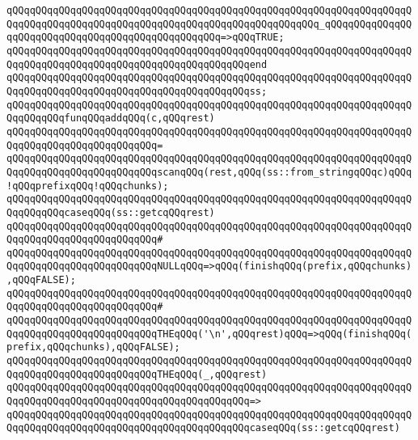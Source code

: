 \verb|qQQqqQQqqQQqqQQqqQQqqQQqqQQqqQQqqQQqqQQqqQQqqQQqqQQqqQQqqQQqqQQqqQQqqQQqqQQqqQQqqQQqqQQqqQQqqQQqqQQqqQQqqQQqqQQqqQQqqQQqqQQq_qQQqqQQqqQQqqQQqqQQqqQQqqQQqqQQqqQQqqQQqqQQqqQQqqQQq=>qQQqTRUE;|\newline
\verb|qQQqqQQqqQQqqQQqqQQqqQQqqQQqqQQqqQQqqQQqqQQqqQQqqQQqqQQqqQQqqQQqqQQqqQQqqQQqqQQqqQQqqQQqqQQqqQQqqQQqqQQqqQQqqQQqend|\newline
\newline
\verb|qQQqqQQqqQQqqQQqqQQqqQQqqQQqqQQqqQQqqQQqqQQqqQQqqQQqqQQqqQQqqQQqqQQqqQQqqQQqqQQqqQQqqQQqqQQqqQQqqQQqqQQqqQQqqQQqss;|\newline
\newline
\verb|qQQqqQQqqQQqqQQqqQQqqQQqqQQqqQQqqQQqqQQqqQQqqQQqqQQqqQQqqQQqqQQqqQQqqQQqqQQqqQQqfunqQQqaddqQQq(c,qQQqrest)|\newline
\verb|qQQqqQQqqQQqqQQqqQQqqQQqqQQqqQQqqQQqqQQqqQQqqQQqqQQqqQQqqQQqqQQqqQQqqQQqqQQqqQQqqQQqqQQqqQQqqQQq=|\newline
\verb|qQQqqQQqqQQqqQQqqQQqqQQqqQQqqQQqqQQqqQQqqQQqqQQqqQQqqQQqqQQqqQQqqQQqqQQqqQQqqQQqqQQqqQQqqQQqqQQqscanqQQq(rest,qQQq(ss::from_stringqQQqc)qQQq!qQQqprefixqQQq!qQQqchunks);|\newline
\newline
\verb|qQQqqQQqqQQqqQQqqQQqqQQqqQQqqQQqqQQqqQQqqQQqqQQqqQQqqQQqqQQqqQQqqQQqqQQqqQQqqQQqcaseqQQq(ss::getcqQQqrest)|\newline
\verb|qQQqqQQqqQQqqQQqqQQqqQQqqQQqqQQqqQQqqQQqqQQqqQQqqQQqqQQqqQQqqQQqqQQqqQQqqQQqqQQqqQQqqQQqqQQqqQQq#|\newline
\verb|qQQqqQQqqQQqqQQqqQQqqQQqqQQqqQQqqQQqqQQqqQQqqQQqqQQqqQQqqQQqqQQqqQQqqQQqqQQqqQQqqQQqqQQqqQQqqQQqNULLqQQq=>qQQq(finishqQQq(prefix,qQQqchunks),qQQqFALSE);|\newline
\verb|qQQqqQQqqQQqqQQqqQQqqQQqqQQqqQQqqQQqqQQqqQQqqQQqqQQqqQQqqQQqqQQqqQQqqQQqqQQqqQQqqQQqqQQqqQQqqQQq#|\newline
\verb|qQQqqQQqqQQqqQQqqQQqqQQqqQQqqQQqqQQqqQQqqQQqqQQqqQQqqQQqqQQqqQQqqQQqqQQqqQQqqQQqqQQqqQQqqQQqqQQqTHEqQQq('\n',qQQqrest)qQQq=>qQQq(finishqQQq(prefix,qQQqchunks),qQQqFALSE);|\newline
\newline
\verb|qQQqqQQqqQQqqQQqqQQqqQQqqQQqqQQqqQQqqQQqqQQqqQQqqQQqqQQqqQQqqQQqqQQqqQQqqQQqqQQqqQQqqQQqqQQqqQQqTHEqQQq(_,qQQqrest)|\newline
\verb|qQQqqQQqqQQqqQQqqQQqqQQqqQQqqQQqqQQqqQQqqQQqqQQqqQQqqQQqqQQqqQQqqQQqqQQqqQQqqQQqqQQqqQQqqQQqqQQqqQQqqQQqqQQqqQQq=>|\newline
\verb|qQQqqQQqqQQqqQQqqQQqqQQqqQQqqQQqqQQqqQQqqQQqqQQqqQQqqQQqqQQqqQQqqQQqqQQqqQQqqQQqqQQqqQQqqQQqqQQqqQQqqQQqqQQqqQQqcaseqQQq(ss::getcqQQqrest)|\newline
